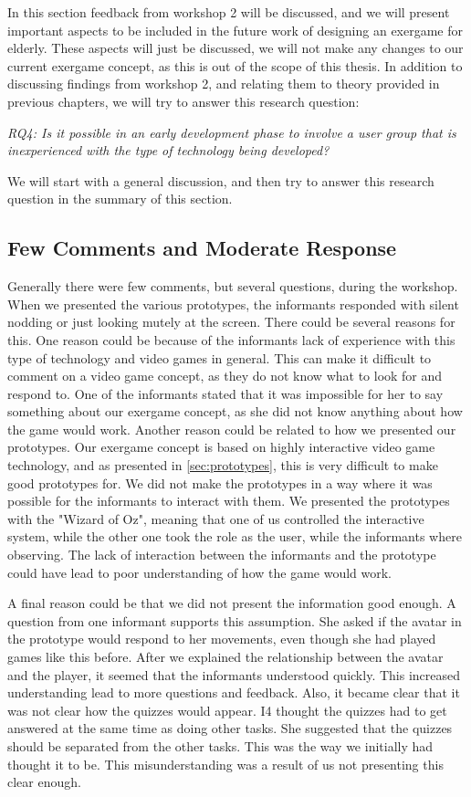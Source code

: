 In this section feedback from workshop 2 will be discussed, and we will present important aspects to be included in the future work of designing an exergame for elderly. These aspects will just be discussed, we will not make any changes to our current exergame concept, as this is out of the scope of this thesis. In addition to discussing findings from workshop 2, and relating them to theory provided in previous chapters, we will try to answer this research question:
 
\emph{RQ4: Is it possible in an early development phase to involve a user group that is inexperienced with the type of technology being developed?}

We will start with a general discussion, and then try to answer this research question in the summary of this section. 

\subsection{Few Comments and Moderate Response}
Generally there were few comments, but several questions, during the workshop. When we presented the various prototypes, the informants responded with silent nodding or just looking mutely at the screen. There could be several reasons for this. One reason could be because of the informants lack of experience with this type of technology and video games in general. This can make it difficult to comment on a video game concept, as they do not know what to look for and respond to. One of the informants stated that it was impossible for her to say something about our exergame concept, as she did not know anything about how the game would work. Another reason could be related to how we presented our prototypes. Our exergame concept is based on highly interactive video game technology, and as presented in \ref{sec:prototypes}, this is very difficult to make good prototypes for. We did not make the prototypes in a way where it was possible for the informants to interact with them. We presented the prototypes with the "Wizard of Oz", meaning that one of us controlled the interactive system, while the other one took the role as the user, while the informants where observing. The lack of interaction between the informants and the prototype could have lead to poor understanding of how the game would work. 

A final reason could be that we did not present the information good enough. A question from one informant supports this assumption. She asked if the avatar in the prototype would respond to her movements, even though she had played games like this before. After we explained the relationship between the avatar and the player, it seemed that the informants understood quickly. This increased understanding lead to more questions and feedback. Also, it became clear that it was not clear how the quizzes would appear. I4 thought the quizzes had to get answered at the same time as doing other tasks. She suggested that the quizzes should be separated from the other tasks. This was the way we initially had thought it to be. This misunderstanding was a result of us not presenting this clear enough.

